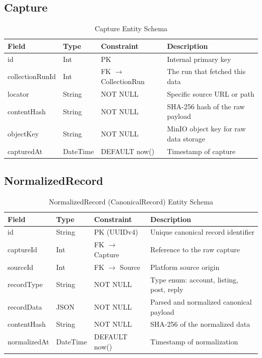 \subsection{Capture}
\begin{table}[htpb]
\centering
\begin{tabular}{lllp{6cm}}
\toprule
\textbf{Field} & \textbf{Type} & \textbf{Constraint} & \textbf{Description} \\
\midrule
id & Int & PK & Internal primary key \\
collectionRunId & Int & FK $\rightarrow$ CollectionRun & The run that fetched this data \\
locator & String & NOT NULL & Specific source URL or path \\
contentHash & String & NOT NULL & SHA-256 hash of the raw payload \\
objectKey & String & NOT NULL & MinIO object key for raw data storage \\
capturedAt & DateTime & DEFAULT now() & Timestamp of capture \\
\bottomrule
\end{tabular}
\caption{Capture Entity Schema}
\end{table}

\subsection{NormalizedRecord}
\begin{table}[htpb]
\centering
\begin{tabular}{lllp{6cm}}
\toprule
\textbf{Field} & \textbf{Type} & \textbf{Constraint} & \textbf{Description} \\
\midrule
id & String & PK (UUIDv4) & Unique canonical record identifier \\
captureId & Int & FK $\rightarrow$ Capture & Reference to the raw capture \\
sourceId & Int & FK $\rightarrow$ Source & Platform source origin \\
recordType & String & NOT NULL & Type enum: account, listing, post, reply \\
recordData & JSON & NOT NULL & Parsed and normalized canonical payload \\
contentHash & String & NOT NULL & SHA-256 of the normalized data \\
normalizedAt & DateTime & DEFAULT now() & Timestamp of normalization \\
\bottomrule
\end{tabular}
\caption{NormalizedRecord (CanonicalRecord) Entity Schema}
\end{table}

